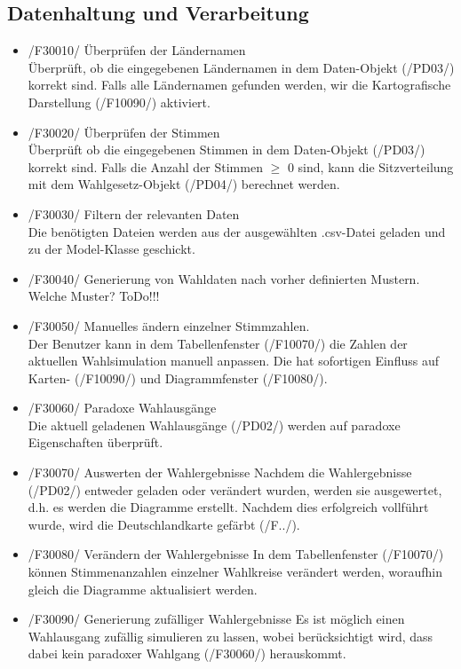 \documentclass[10pt,a4paper]{article}
\begin{document}
\subsection{Datenhaltung und Verarbeitung}
\begin{itemize}
	\item /F30010/ Überprüfen der Ländernamen \hfill \\
	Überprüft, ob die eingegebenen Ländernamen in dem Daten-Objekt (/PD03/) korrekt sind. Falls alle Ländernamen gefunden werden, wir die Kartografische Darstellung (/F10090/) aktiviert.
	\item /F30020/ Überprüfen der Stimmen\hfill \\
	Überprüft ob die eingegebenen Stimmen in dem Daten-Objekt (/PD03/) korrekt sind. Falls die Anzahl der Stimmen $\geq$ 0 sind, kann die Sitzverteilung mit dem Wahlgesetz-Objekt (/PD04/) berechnet werden.
	\item /F30030/ Filtern der relevanten Daten \hfill \\
	Die benötigten Dateien werden aus der ausgewählten .csv-Datei geladen und zu der Model-Klasse geschickt.			\item /F30040/ Generierung von Wahldaten nach vorher definierten Mustern. \hfill \\
	Welche Muster? ToDo!!!
	\item /F30050/ Manuelles ändern einzelner Stimmzahlen. \hfill \\
	Der Benutzer kann in dem Tabellenfenster (/F10070/) die Zahlen der aktuellen Wahlsimulation manuell anpassen.
	Die hat sofortigen Einfluss auf Karten- (/F10090/) und Diagrammfenster (/F10080/).
	\item /F30060/ Paradoxe Wahlausgänge \hfill \\
	Die aktuell geladenen Wahlausgänge (/PD02/) werden auf paradoxe Eigenschaften überprüft.
	\item /F30070/ Auswerten der Wahlergebnisse
	Nachdem die Wahlergebnisse (/PD02/) entweder geladen oder verändert wurden, werden sie ausgewertet, d.h. es werden die Diagramme erstellt. Nachdem dies erfolgreich vollführt wurde, wird die Deutschlandkarte gefärbt (/F../). 
	\item /F30080/ Verändern der Wahlergebnisse
	In dem Tabellenfenster (/F10070/) können Stimmenanzahlen einzelner Wahlkreise verändert werden, woraufhin gleich die Diagramme aktualisiert werden.
	\item /F30090/ Generierung zufälliger Wahlergebnisse
	Es ist möglich einen Wahlausgang zufällig simulieren zu lassen, wobei berücksichtigt wird, dass dabei kein paradoxer Wahlgang (/F30060/) herauskommt.
	
\end{itemize}
\end{document}
